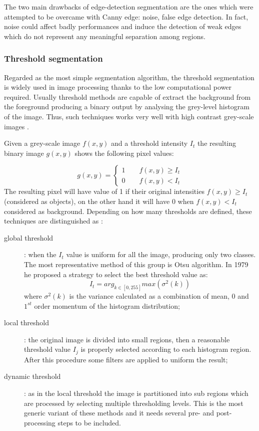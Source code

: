 \documentclass[../main.tex]{subfiles}
\begin{document}
The two main drawbacks of edge-detection segmentation are the ones which were attempted to be overcame with Canny edge: noise, false edge detection. In fact, noise could affect badly performances and induce the detection of weak edges which do not represent any meaningful separation among regions.



\subsubsection{\large{Threshold segmentation}}
 
Regarded as the most simple segmentation algorithm, the threshold segmentation is widely used in image processing thanks to the low computational power required. 
Usually threshold methods are capable of extract the background from the foreground producing a binary output by analysing the grey-level histogram of the image. Thus, such techniques works very well with high contrast grey-scale images \cite{niu2019research-threshold-segmentaton}. 

Given a grey-scale image $f(x,y)$ and a threshold intensity $I_{t}$ the resulting binary image $g(x,y)$ shows the following pixel values:

\begin{equation}
    g(x,y) = \begin{cases}
                1 \qquad f(x,y) \ge I_{t} \\
                0 \qquad f(x,y) < I_{t} 
             \end{cases}
\end{equation}
The resulting pixel will have value of 1 if their original intensities $f(x,y) \ge I_{t}$ (considered as objects), on the other hand it will have 0 when $f(x,y) < I_{t}$ considered as background.
Depending on how many thresholds are defined, these techniques are distinguished as \cite{kang2009comparative}:

\begin{description}
\item[global threshold] : when the $I_{t}$ value is uniform for all the image, producing only two classes. 
The most representative method of this group is Otsu \cite{otsu} algorithm. 
In 1979 he proposed a strategy to select the best threshold value as:
\begin{equation}
    I_{t} = arg_{k \in [0, 255]}max(\sigma^{2}(k))
\end{equation}
where $\sigma^{2}(k)$ is the variance calculated as a combination of mean, $0$ and  $1^{st}$ order momentum of the histogram distribution;
\item[local threshold] : the original image is divided into small regions, then a reasonable threshold value $I_{j}$ is properly selected according to each histogram region.
After this procedure some filters are applied to uniform the result;
\item[dynamic threshold] : as in the local threshold the image is partitioned into sub regions which are processed by selecting multiple thresholding levels. 
This is the most generic variant of these methods and it needs several pre- and post-processing steps to be included. 
\end{description}
\end{document}
